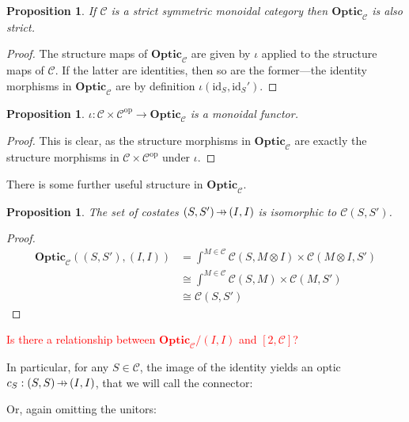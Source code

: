 \documentclass[11pt,a4paper]{article}
\theoremstyle{plain}
\newtheorem{proposition}[theorem]{Proposition}
\theoremstyle{definition}
\newcommand{\C}{\mathscr{C}}
\newcommand{\Optic}{\mathbf{Optic}}
\newcommand{\id}{\mathrm{id}}
\newcommand{\op}{\mathrm{op}}
\newcommand{\hto}{\ensuremath{\,\mathaccent\shortmid\rightarrow\,}}
\newcommand{\todo}[1]{\textcolor{red}{\small #1}}
\begin{document}
\begin{proposition}
  If $\C$ is a strict symmetric monoidal category then $\Optic_\C$ is also strict.
\end{proposition}
\begin{proof}
  The structure maps of $\Optic_\C$ are given by $\iota$ applied to the structure maps of $\C$. If the latter are identities, then so are the former---the identity morphisms in $\Optic_\C$ are by definition $\iota(\id_S, \id_S')$.
\end{proof}

\begin{proposition}
  $\iota : \C \times \C^\op \to \Optic_\C$ is a monoidal functor.
\end{proposition}
\begin{proof}
  This is clear, as the structure morphisms in $\Optic_\C$ are exactly the structure morphisms in $\C \times \C^\op$ under $\iota$.
\end{proof}


There is some further useful structure in $\Optic_\C$.
\begin{proposition}
\label{prop-costates}
  The set of costates $(S, S') \hto (I, I)$ is isomorphic to $\C(S, S')$.
\end{proposition}
\begin{proof}
  \begin{align*}
    \Optic_\C((S, S'), (I, I))
    &= \int^{M \in \C} \C(S, M \otimes I) \times \C(M \otimes I, S') \\
    &\cong \int^{M \in \C} \C(S, M) \times \C(M, S') \\
    &\cong \C(S, S')
  \end{align*}
\end{proof}

\todo{Is there a relationship between $\Optic_\C/(I, I)$ and $[2, \C]$?}

In particular, for any $S \in \C$, the image of the identity yields an optic $c_S : (S, S) \hto (I, I)$, that we will call the connector:
\begin{center}
  
\end{center}
Or, again omitting the unitors:
\begin{center}
  
\end{center}
\end{document}

